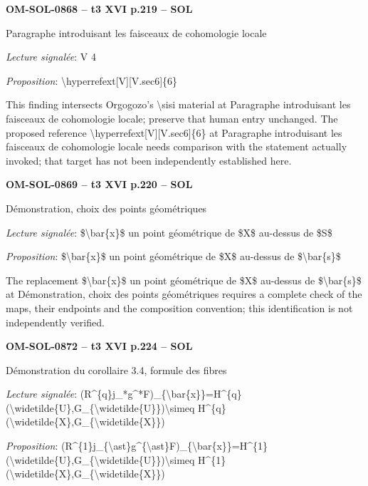 \par\noindent\textbf{OM-SOL-0868 -- t3 XVI p.219 -- SOL}\par
Paragraphe introduisant les faisceaux de cohomologie locale\par
\emph{Lecture signalée}: V 4\par
\emph{Proposition}: \textbackslash{}hyperrefext[V][V.sec6]\{6\}\par
This finding intersects Orgogozo's \textbackslash{}sisi material at Paragraphe introduisant les faisceaux de cohomologie locale; preserve that human entry unchanged. The proposed reference \textbackslash{}hyperrefext[V][V.sec6]\{6\} at Paragraphe introduisant les faisceaux de cohomologie locale needs comparison with the statement actually invoked; that target has not been independently established here.\par
\par\noindent\textbf{OM-SOL-0869 -- t3 XVI p.220 -- SOL}\par
Démonstration, choix des points géométriques\par
\emph{Lecture signalée}: \$\textbackslash{}bar\{x\}\$ un point géométrique de \$X\$ au-dessus de \$S\$\par
\emph{Proposition}: \$\textbackslash{}bar\{x\}\$ un point géométrique de \$X\$ au-dessus de \$\textbackslash{}bar\{s\}\$\par
The replacement \$\textbackslash{}bar\{x\}\$ un point géométrique de \$X\$ au-dessus de \$\textbackslash{}bar\{s\}\$ at Démonstration, choix des points géométriques requires a complete check of the maps, their endpoints and the composition convention; this identification is not independently verified.\par
\par\noindent\textbf{OM-SOL-0872 -- t3 XVI p.224 -- SOL}\par
Démonstration du corollaire 3.4, formule des fibres\par
\emph{Lecture signalée}: (R\textasciicircum{}\{q\}j\_*g\textasciicircum{}*F)\_\{\textbackslash{}bar\{x\}\}=\allowbreak H\textasciicircum{}\{q\}(\textbackslash{}widetilde\{U\},G\_\{\textbackslash{}widetilde\{U\}\})\textbackslash{}simeq H\textasciicircum{}\{q\}(\textbackslash{}widetilde\{X\},G\_\{\textbackslash{}widetilde\{X\}\})\par
\emph{Proposition}: (R\textasciicircum{}\{1\}j\_\{\textbackslash{}ast\}g\textasciicircum{}\{\textbackslash{}ast\}F)\_\{\textbackslash{}bar\{x\}\}=\allowbreak H\textasciicircum{}\{1\}(\textbackslash{}widetilde\{U\},G\_\{\textbackslash{}widetilde\{U\}\})\textbackslash{}simeq H\textasciicircum{}\{1\}(\textbackslash{}widetilde\{X\},G\_\{\textbackslash{}widetilde\{X\}\})\par
